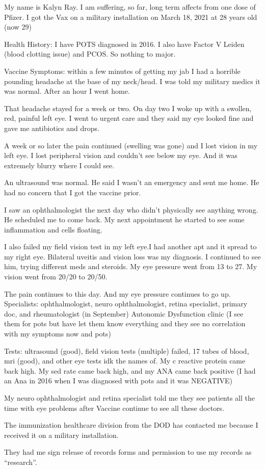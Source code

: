 My name is Kalyn Ray. I am suffering, so far, long term affects from one dose of
Pfizer. I got the Vax on a military installation on March 18, 2021 at 28 years
old (now 29)

Health History: I have POTS diagnosed in 2016. I also have Factor V Leiden
(blood clotting issue) and PCOS. So nothing to major.

Vaccine Symptoms: within a few minutes of getting my jab I had a horrible
pounding headache at the base of my neck/head. I was told my military medics it
was normal. After an hour I went home.

That headache stayed for a week or two. On day two I woke up with a swollen,
red, painful left eye. I went to urgent care and they said my eye looked fine
and gave me antibiotics and drops.

A week or so later the pain continued (swelling was gone) and I lost vision in
my left eye. I lost peripheral vision and couldn’t see below my eye. And it was
extremely blurry where I could see.

An ultrasound was normal. He said I wasn’t an emergency and sent me home. He had
no concern that I got the vaccine prior.

I saw an ophthalmologist the next day who didn’t physically see anything
wrong. He scheduled me to come back. My next appointment he started to see some
inflammation and cells floating.

I also failed my field vision test in my left eye.I had another apt and it
spread to my right eye. Bilateral uveitis and vision loss was my diagnosis. I
continued to see him, trying different meds and steroids. My eye pressure went
from 13 to 27. My vision went from 20/20 to 20/50.

The pain continues to this day. And my eye pressure continues to go
up. Specialists: ophthalmologist, neuro ophthalmologist, retina specialist,
primary doc, and rheumatologist (in September) Autonomic Dysfunction clinic (I
see them for pots but have let them know everything and they see no correlation
with my symptoms now and pots)

Tests: ultrasound (good), field vision tests (multiple) failed, 17 tubes of
blood, mri (good), and other eye tests idk the names of. My c reactive protein
came back high. My sed rate came back high, and my ANA came back positive (I had
an Ana in 2016 when I was diagnosed with pots and it was NEGATIVE)

My neuro ophthalmologist and retina specialist told me they see patients all the
time with eye problems after Vaccine continue to see all these doctors.

The immunization healthcare division from the DOD has contacted me because I
received it on a military installation.

They had me sign release of records forms and permission to use my records as
“research”.

